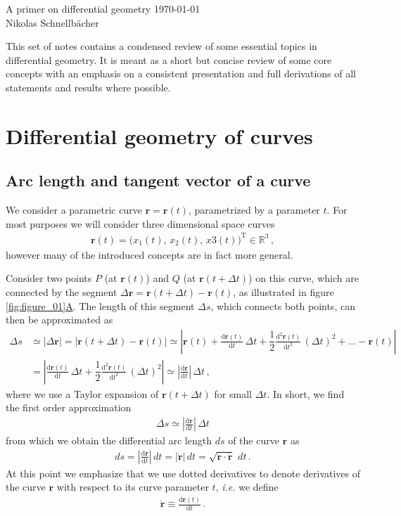 \documentclass[11pt, DINA4, fleqn]{amsart}
\def\df{\mathrm{d}\xspace}
\newcommand{\dd}[2]{\frac{\df#1}{\df#2}}
\newcommand{\ddd}[2]{\frac{\df^2#1}{\df#2^2}}
\def\vr{\boldsymbol{r}\xspace}
\def\vrd{\dot{\vr}\xspace}
\begin{document}
\begin{flushleft}
{\sc \LARGE A primer on differential geometry} \hfill \today \\
\medskip
\Large
Nikolas Schnellbächer \underline{\hspace{6.53in}} \\
\end{flushleft}

This set of notes contains a condensed review of some essential topics in differential geometry. 
It is meant as a short but concise review of some core concepts with an emphasis on a consistent presentation and full derivations of all statements and results
where possible.

\section{Differential geometry of curves}
\subsection{Arc length and tangent vector of a curve}

We consider a parametric curve $\vr = \vr(t)$, parametrized by a parameter $t$.
For most purposes we will consider three dimensional space curves
\begin{align}
\vr(t) = \bigl(x_1(t),\, x_2(t),\, x3(t)\bigl)^{\text{T}}\in \mathbb{R}^3 \, ,
\end{align}
however many of the introduced concepts are in fact more general.

Consider two points $P$ (at $\vr(t)$) and $Q$ (at $\vr(t+ \Delta t)$) on this curve, which are connected by the segment $\Delta\vr = \vr(t+\Delta t) - \vr(t)$, as illustrated in figure \ref{fig:figure_01}\hyperref[fig:figure_01]{A}. The length of this segment $\Delta s$, which connects both points, can then be approximated as
\begin{align}
\Delta s &\simeq |\Delta \vr| = 
\left| \vr(t + \Delta t) - \vr(t)
\right| \simeq
\left|
\vr(t) + \dd{\vr(t)}{t}\, \Delta t + \dfrac{1}{2}\ddd{\vr(t)}{t}\, (\Delta t)^2 + \dots
- \vr(t)
\right| \\
&= 
\left|
\dd{\vr(t)}{t}\, \Delta t + \dfrac{1}{2}\ddd{\vr(t)}{t}\, (\Delta t)^2
\right|
\simeq \left|\dd{\vr}{t}\right| \, \Delta t \, ,
\end{align}
where we use a Taylor expansion of $\vr(t+\Delta t)$ for small $\Delta t$. In short, we find the first order approximation
\begin{align}
\Delta s \simeq \left|\dd{\vr}{t}\right| \, \Delta t
\end{align}
from which we obtain the differential arc length $ds$ of the curve $\vr$ as
\begin{align}
ds = \left|\dd{\vr}{t}\right| \, dt
= \left|\vrd\right| \, dt = \sqrt{\vrd \cdot \vrd} \,\, dt \, .
\label{eq:diffArc}
\end{align}
At this point we emphasize
that we use dotted derivatives to denote derivatives of the curve $\vr$ with respect to its curve parameter $t$, \textit{i.e.} we define
\begin{align}
\vrd \equiv \dd{\vr(t)}{t} \, .
\end{align}
\end{document}
